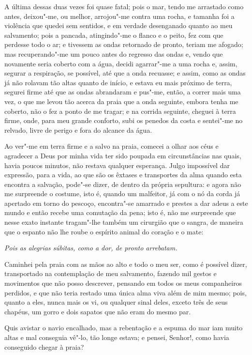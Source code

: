 A última dessas duas vezes foi quase fatal; pois o mar, tendo me
arrastado como antes, deixou"-me, ou melhor, arrojou"-me contra uma rocha,
e tamanha foi a violência que quedei sem sentidos, e em verdade
desenganado quanto ao meu salvamento; pois a pancada, atingindo"-me o
flanco e o peito, fez com que perdesse todo o ar; e tivessem as ondas
retornado de pronto, teriam me afogado; mas recuperando"-me um pouco
antes do regresso das ondas e, vendo que novamente seria coberto com a
água, decidi agarrar"-me a uma rocha e, assim, segurar a respiração, se
possível, até que a onda recuasse; e assim, como as ondas já não rolavam
tão altas quanto de início, e estava eu mais próximo de terra, segurei
firme até que as ondas abrandaram e pus"-me, então, a correr mais uma
vez, o que me levou tão acerca da praia que a onda seguinte, embora
tenha me coberto, não o fez a ponto de me tragar; e na corrida seguinte,
cheguei à terra firme, onde, para meu grande conforto, subi os penedos
da costa e sentei"-me no relvado, livre de perigo e fora do alcance da
água.

Ao ver"-me em terra firme e a salvo na praia, comecei a olhar aos céus e
agradecer a Deus por minha vida ter sido poupada em circunstâncias nas
quais, havia poucos minutos, não restava qualquer esperança. Julgo
impossível dar expressão, para a vida, ao que são os êxtases e
transportes da alma quando esta encontra a salvação, pode"-se dizer, de
dentro da própria sepultura: e agora não me surpreende o costume, isto
é, quando um malfeitor, já com o nó da corda já apertado em torno do
pescoço, encontra"-se amarrado e prestes a dar adeus a este mundo e então
recebe uma comutação da pena; isto é, não me surpreende que nesse exato
instante tragam"-lhe também um cirurgião que o sangra, de maneira que o
espanto não lhe roube o espírito animal do coração e o mate:

\emph{Pois as alegrias súbitas, como a dor, de pronto arrebatam.}

Caminhei pela praia com as mãos ao alto e todo o meu ser, como é
possível dizer, transportado na contemplação de meu salvamento, fazendo
mil gestos e movimentos que não posso descrever, pensando em todos os
meus companheiros perdidos, e que não teria restado uma única alma viva
além de mim mesmo; pois, quanto a eles, nunca mais os vi, ou qualquer
sinal deles, exceto três de seus chapéus, um gorro e dois sapatos que
não eram do mesmo par.

Quis avistar o navio encalhado, mas a rebentação e a espuma do mar iam
muito altas e mal conseguia vê"-lo, tão longe estava; e pensei, Senhor!,
como havia conseguido chegar à praia?

